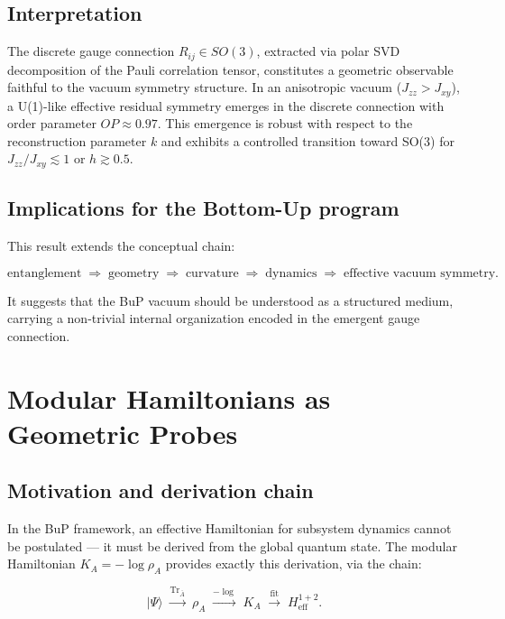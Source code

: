 \documentclass[11pt]{article}
\begin{document}
\subsection{Interpretation}

The discrete gauge connection $R_{ij} \in SO(3)$, extracted via
polar SVD decomposition of the Pauli correlation tensor, constitutes
a geometric observable faithful to the vacuum symmetry structure.
In an anisotropic vacuum ($J_{zz} > J_{xy}$), a U(1)-like effective
residual symmetry emerges in the discrete connection with order
parameter $OP \approx 0.97$. This emergence is robust with respect
to the reconstruction parameter $k$ and exhibits a controlled
transition toward SO(3) for $J_{zz}/J_{xy} \lesssim 1$ or
$h \gtrsim 0.5$.

\subsection{Implications for the Bottom-Up program}

This result extends the conceptual chain:

\[
\text{entanglement}
\;\Longrightarrow\;
\text{geometry}
\;\Longrightarrow\;
\text{curvature}
\;\Longrightarrow\;
\text{dynamics}
\;\Longrightarrow\;
\text{effective vacuum symmetry}.
\]

It suggests that the BuP vacuum should be understood as a structured
medium, carrying a non-trivial internal organization encoded in the
emergent gauge connection.


\section{Modular Hamiltonians as Geometric Probes}

\subsection{Motivation and derivation chain}

In the BuP framework, an effective Hamiltonian for subsystem dynamics
cannot be postulated --- it must be derived from the global quantum
state. The modular Hamiltonian $K_A = -\log\rho_A$ provides exactly
this derivation, via the chain:

\[
|\Psi\rangle
\;\xrightarrow{\mathrm{Tr}_{\bar{A}}}\;
\rho_A
\;\xrightarrow{-\log}\;
K_A
\;\xrightarrow{\mathrm{fit}}\;
H_{\mathrm{eff}}^{1+2}.
\]
\end{document}

